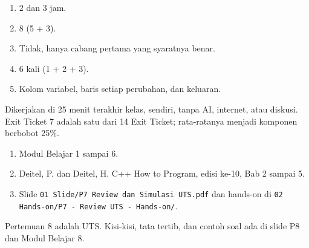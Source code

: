 \documentclass[a4paper]{article}
\begin{document}
\begin{Jawaban}[]
\begin{enumerate}[leftmargin=16pt]
\item 2 dan 3 jam.
\item 8 (5 + 3).
\item Tidak, hanya cabang pertama yang syaratnya benar.
\item 6 kali (1 + 2 + 3).
\item Kolom variabel, baris setiap perubahan, dan keluaran.
\end{enumerate}
\end{Jawaban}
Dikerjakan di 25 menit terakhir kelas, sendiri, tanpa AI, internet, atau diskusi. Exit Ticket 7 adalah satu dari 14 Exit Ticket; rata-ratanya menjadi komponen berbobot 25\%.
\par\vspace{4pt}\par\vspace{6pt}
\begin{enumerate}
\item Modul Belajar 1 sampai 6.
\item Deitel, P. dan Deitel, H. C++ How to Program, edisi ke-10, Bab 2 sampai 5.
\item Slide \texttt{01 Slide/P7 Review dan Simulasi UTS.pdf} dan hands-on di \texttt{02 Hands-on/P7 - Review UTS - Hands-on/}.
\end{enumerate}
\begin{Penting}
Pertemuan 8 adalah UTS. Kisi-kisi, tata tertib, dan contoh soal ada di slide P8 dan Modul Belajar 8.
\end{Penting}
\end{document}
